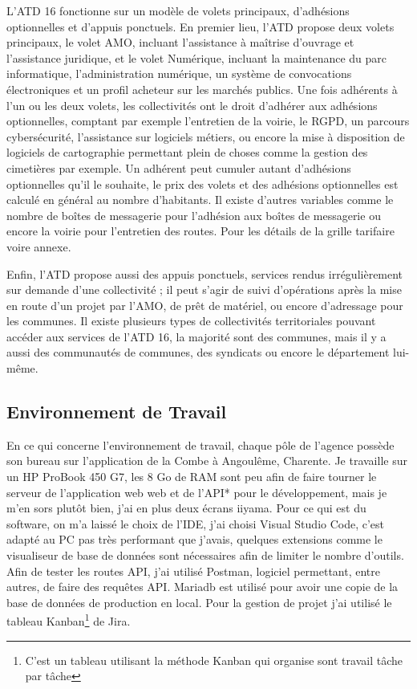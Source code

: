 \documentclass[a4paper,12pt]{report}
\begin{document}
L'ATD 16 fonctionne sur un modèle de volets principaux, d'adhésions optionnelles et d'appuis ponctuels. En premier lieu, l'ATD propose deux volets principaux, le volet AMO, incluant l'assistance à maîtrise d'ouvrage et l'assistance juridique, et le volet Numérique, incluant la maintenance du parc informatique, l'administration numérique, un système de convocations électroniques et un profil acheteur sur les marchés publics. Une fois adhérents à l'un ou les deux volets, les collectivités ont le droit d'adhérer aux adhésions optionnelles, comptant par exemple l'entretien de la voirie, le RGPD, un parcours cybersécurité, l'assistance sur logiciels métiers, ou encore la mise à disposition de logiciels de cartographie permettant plein de choses comme la gestion des cimetières par exemple. Un adhérent peut cumuler autant d'adhésions optionnelles qu'il le souhaite, le prix des volets et des adhésions optionnelles est calculé en général au nombre d'habitants. Il existe d'autres variables comme le nombre de boîtes de messagerie pour l'adhésion aux boîtes de messagerie ou encore la voirie pour l'entretien des routes. Pour les détails de la grille tarifaire voire annexe.

Enfin, l'ATD propose aussi des appuis ponctuels, services rendus irrégulièrement sur demande d'une collectivité ; il peut s'agir de suivi d'opérations après la mise en route d'un projet par l'AMO, de prêt de matériel, ou encore d'adressage pour les communes. Il existe plusieurs types de collectivités territoriales pouvant accéder aux services de l'ATD 16, la majorité sont des communes, mais il y a aussi des communautés de communes, des syndicats ou encore le département lui-même.



\subsection{Environnement de Travail}

En ce qui concerne l'environnement de travail, chaque pôle de l'agence possède son bureau sur l'application de la Combe à Angoulême, Charente. Je travaille sur un HP ProBook 450 G7, les 8 Go de RAM sont peu afin de faire tourner le serveur de l'application web web et de l'API* pour le développement, mais je m'en sors plutôt bien, j'ai en plus deux écrans iiyama. Pour ce qui est du software, on m'a laissé le choix de l'IDE, j'ai choisi Visual Studio Code, c'est adapté au PC pas très performant que j'avais, quelques extensions comme le visualiseur de base de données sont nécessaires afin de limiter le nombre d'outils. Afin de tester les routes API, j'ai utilisé Postman, logiciel permettant, entre autres, de faire des requêtes API. Mariadb est utilisé pour avoir une copie de la base de données de production en local. Pour la gestion de projet j'ai utilisé le tableau Kanban\footnote{C'est un tableau utilisant la méthode Kanban qui organise sont travail tâche par tâche} de Jira.
\end{document}
